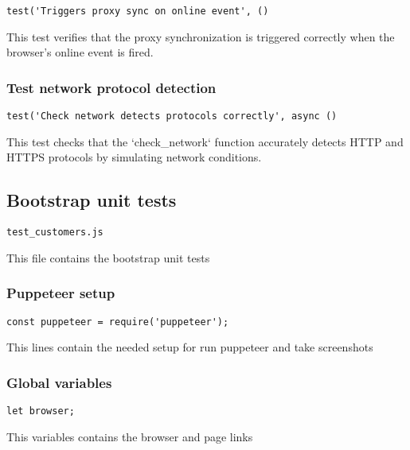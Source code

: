 \documentclass[a4paper]{article}
\begin{document}
\begin{lstlisting}
test('Triggers proxy sync on online event', ()
\end{lstlisting}

This test verifies that the proxy synchronization is triggered correctly
when the browser's online event is fired.

\hypertarget{toc106}{}
\subsubsection{Test network protocol detection}

\begin{lstlisting}
test('Check network detects protocols correctly', async ()
\end{lstlisting}

This test checks that the `check\_network` function accurately detects
HTTP and HTTPS protocols by simulating network conditions.

\hypertarget{toc107}{}
\subsection{Bootstrap unit tests}

\begin{lstlisting}
test_customers.js
\end{lstlisting}

This file contains the bootstrap unit tests

\hypertarget{toc108}{}
\subsubsection{Puppeteer setup}

\begin{lstlisting}
const puppeteer = require('puppeteer');
\end{lstlisting}

This lines contain the needed setup for run puppeteer and take screenshots

\hypertarget{toc109}{}
\subsubsection{Global variables}

\begin{lstlisting}
let browser;
\end{lstlisting}

This variables contains the browser and page links
\end{document}
